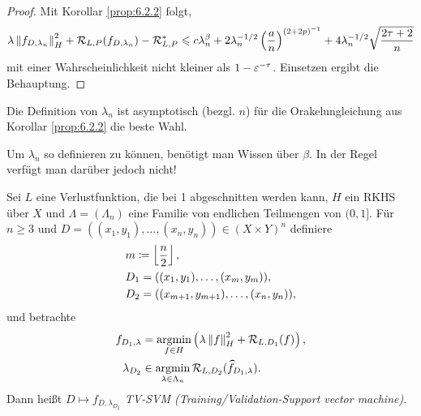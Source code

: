 \begin{proof}
Mit Korollar \ref{prop:6.2.2} folgt,
\begin{align*}
\lambda\left\|f_{D,\lambda_n}\right\|_H^2 + \mathcal{R}_{L,P}(f_{D,\lambda_n})-\mathcal{R}_{L,P}^*
\leqslant c\lambda_n^\beta  + 2\lambda_n^{-1/2}\left(\frac{a}{n}\right)^{(2+2p)^{-1}}
+ 4\lambda_n^{-1/2}\sqrt{\frac{2\tau+2}{n}}
\end{align*}
mit einer Wahrscheinlichkeit nicht kleiner als $1-\varepsilon^{-\tau}$. Einsetzen ergibt
die Behauptung.\qedhere
\end{proof}

\begin{bem*}[Bemerkungen.]
\begin{bemenum}
\item Die Definition von $\lambda_n$ ist asymptotisch (bezgl. $n$) für die
Orakelungleichung aus Korollar \ref{prop:6.2.2} die beste Wahl.
\item Um $\lambda_n$ so definieren zu können, benötigt man Wissen über $\beta$.
In der Regel verfügt man darüber jedoch nicht!\maphere
\end{bemenum}
\end{bem*}

\begin{defn}
\label{defn:6.4.3}
Sei $L$ eine Verlustfunktion, die bei 1 abgeschnitten werden kann, $H$ ein RKHS
über $X$ und $\Lambda = (\Lambda_n)$ eine Familie von endlichen Teilmengen von
$(0,1]$. Für $n\ge 3$ und $D=((x_1,y_1),\ldots,(x_n,y_n))\in (X\times Y)^n$
definiere
\begin{align*}
&m \coloneq \left\lfloor \frac{n}{2} \right\rfloor,\\
&D_1 = ((x_1,y_1),\ldots,(x_m,y_m)),\\
&D_2 = ((x_{m+1},y_{m+1}),\ldots,(x_n,y_n)),
\end{align*}
und betrachte
\begin{align*}
f_{D_1,\lambda} &= \argmin\limits_{f\in H} \left(\lambda\norm{f}_H^2 +
\RR_{L,D_1}(f) \right),\\
\lambda_{D_2} &\in \argmin_{\lambda\in \Lambda_n}
\RR_{L,D_2}(\cut{f}_{D_1,\lambda}).
\end{align*}
Dann heißt $D\mapsto f_{D,\lambda_{D_2}}$ \emph{TV-SVM
(Training/Validation-Support vector machine)}.~\fishhere
{}
\end{defn}

